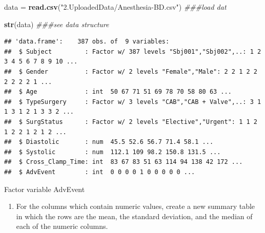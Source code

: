 \documentclass[]{book}
\newenvironment{Shaded}{\begin{snugshade}}{\end{snugshade}}
\newcommand{\CommentTok}[1]{\textcolor[rgb]{0.56,0.35,0.01}{\textit{#1}}}
\newcommand{\DataTypeTok}[1]{\textcolor[rgb]{0.13,0.29,0.53}{#1}}
\newcommand{\DecValTok}[1]{\textcolor[rgb]{0.00,0.00,0.81}{#1}}
\newcommand{\KeywordTok}[1]{\textcolor[rgb]{0.13,0.29,0.53}{\textbf{#1}}}
\newcommand{\NormalTok}[1]{#1}
\newcommand{\OperatorTok}[1]{\textcolor[rgb]{0.81,0.36,0.00}{\textbf{#1}}}
\newcommand{\StringTok}[1]{\textcolor[rgb]{0.31,0.60,0.02}{#1}}
\providecommand{\tightlist}{%
  \setlength{\itemsep}{0pt}\setlength{\parskip}{0pt}}
\begin{document}
\begin{Shaded}
\begin{Highlighting}[]
\NormalTok{data =}\StringTok{ }\KeywordTok{read.csv}\NormalTok{(}\StringTok{"2.UploadedData/Anesthesia-BD.csv"}\NormalTok{) }\CommentTok{###load dat}

\KeywordTok{str}\NormalTok{(data) }\CommentTok{###see data structure}
\end{Highlighting}
\end{Shaded}

\begin{verbatim}
## 'data.frame':    387 obs. of  9 variables:
##  $ Subject         : Factor w/ 387 levels "Sbj001","Sbj002",..: 1 2 3 4 5 6 7 8 9 10 ...
##  $ Gender          : Factor w/ 2 levels "Female","Male": 2 2 1 2 2 2 2 2 2 1 ...
##  $ Age             : int  50 67 71 51 69 78 70 58 80 63 ...
##  $ TypeSurgery     : Factor w/ 3 levels "CAB","CAB + Valve",..: 3 1 1 3 1 2 1 3 3 2 ...
##  $ SurgStatus      : Factor w/ 2 levels "Elective","Urgent": 1 1 2 1 2 2 1 2 1 2 ...
##  $ Diastolic       : num  45.5 52.6 56.7 71.4 58.1 ...
##  $ Systolic        : num  112.1 109 98.2 150.8 131.5 ...
##  $ Cross_Clamp_Time: int  83 67 83 51 63 114 94 138 42 172 ...
##  $ AdvEvent        : int  0 0 0 0 1 0 0 0 0 0 ...
\end{verbatim}

Factor variable AdvEvent

\begin{Shaded}
\end{Shaded}

\begin{enumerate}
\def\labelenumi{\arabic{enumi}.}
\setcounter{enumi}{1}
\tightlist
\item
  For the columns which contain numeric values, create a new summary table in which the rows are the mean, the standard deviation, and the median of each of the numeric columns.
\end{enumerate}
\end{document}
